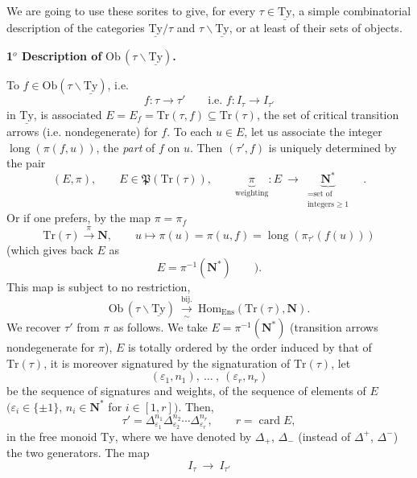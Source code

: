 \documentclass[11pt]{article}
\newcommand{\msp}[1]{\marginpar{\footnotesize [#1]}}
\newcommand{\Tr}{\mathrm{Tr}}
\newcommand{\Hom}{\mathrm{Hom}}
\newcommand{\Ob}{\mathrm{Ob}}
\newcommand{\lng}{\operatorname{long}}
\newcommand{\card}{\operatorname{card}}
\newcommand{\uTy}{\underline{\mathrm{Ty}}}
\begin{document}
We are going to use these sorites to give, for every $\tau \in \uTy$, a simple combinatorial description of the categories $\uTy/\tau$ and $\tau\backslash\uTy$, or at least of their sets of objects.

\textbf{1$^o$ Description of} $\Ob\,(\tau\backslash\uTy)$\textbf{.}

To $f \in \Ob(\tau\backslash\uTy)$, i.e.
\[
f : \tau \longrightarrow \tau' \qquad \text{i.e. } f : I_\tau \longrightarrow I_{\tau'}
\]
in $\uTy$, is associated $E = E_f = \Tr(\tau, f) \subseteq \Tr(\tau)$, the set of critical transition arrows (i.e. nondegenerate) for $f$. To each $u \in E$, let us associate the integer $\lng(\pi(f, u))$,
\msp{page 44}
the \textit{part} of $f$ on $u$. Then $(\tau', f)$ is uniquely determined by the pair
\[
(E, \pi), \qquad E \in \mathfrak{P}(\Tr(\tau)), \qquad \underbrace{\pi}_{\text{weighting}} : E \ \longrightarrow\ \underbrace{\mathbf{N}^*}_{\substack{= \text{set of} \\ \text{integers} \geq 1}} \quad .
\]
Or if one prefers, by the map $\pi = \pi_f$
\[
\Tr(\tau) \xrightarrow{\pi} \mathbf{N}, \qquad u \longmapsto \pi(u) = \pi(u, f) = \lng(\pi_{\tau'}(f(u)))
\]
(which gives back $E$ as
\[
E = \pi^{-1}(\mathbf{N}^*) \qquad ).
\]
This map is subject to no restriction,
\[
\Ob\,(\tau\backslash\uTy) \ \xrightarrow[\sim]{\text{bij.}}\ \Hom_{\mathrm{Ens}}(\Tr(\tau), \mathbf{N}).
\]
We recover $\tau'$ from $\pi$ as follows. We take $E = \pi^{-1}(\mathbf{N}^*)$ (transition arrows nondegenerate for $\pi$), $E$ is totally ordered by the order induced by that of $\Tr(\tau)$, it is moreover signatured by the signaturation of $\Tr(\tau)$, let
\[
(\varepsilon_1, n_1),\ \dots\ ,\ (\varepsilon_r, n_r)
\]
be the sequence of signatures and weights, of the sequence of elements of $E$ $(\varepsilon_i \in \{\pm 1\}$, $n_i \in \mathbf{N}^*$ for $i \in [1, r])$. Then,
\[
\tau' = \Delta_{\varepsilon_1}^{n_1} \Delta_{\varepsilon_2}^{n_2} \cdots \Delta_{\varepsilon_r}^{n_r}, \qquad r = \card E,
\]
in the free monoid $\mathrm{Ty}$, where we have denoted by $\Delta_+$, $\Delta_-$ (instead of $\Delta^+$, $\Delta^-$) the two generators. The map
\[
I_\tau \ \longrightarrow\ I_{\tau'}
\]
\end{document}
